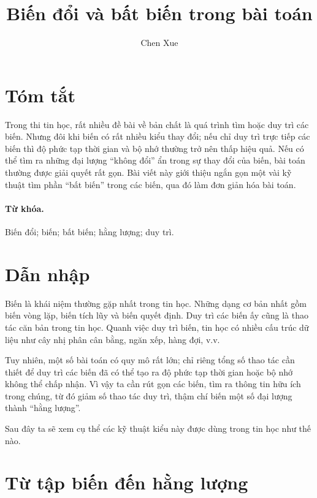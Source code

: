\documentclass[11pt]{article}
\title{Biến đổi và bất biến trong bài toán}
\author{Chen Xue}
\date{}
\begin{document}
\maketitle


\section*{Tóm tắt}

Trong thi tin học, rất nhiều đề bài về bản chất là quá trình tìm hoặc duy trì
các biến. Nhưng đôi khi biến có rất nhiều kiểu thay đổi; nếu chỉ duy trì trực
tiếp các biến thì độ phức tạp thời gian và bộ nhớ thường trở nên thấp hiệu
quả. Nếu có thể tìm ra những đại lượng ``không đổi'' ẩn trong sự thay đổi của
biến, bài toán thường được giải quyết rất gọn. Bài viết này giới thiệu ngắn
gọn một vài kỹ thuật tìm phần ``bất biến'' trong các biến, qua đó làm đơn giản
hóa bài toán.

\paragraph{Từ khóa.}
Biến đổi; biến; bất biến; hằng lượng; duy trì.

\section{Dẫn nhập}

Biến là khái niệm thường gặp nhất trong tin học. Những dạng cơ bản nhất gồm
biến vòng lặp, biến tích lũy và biến quyết định. Duy trì các biến ấy cũng là
thao tác căn bản trong tin học. Quanh việc duy trì biến, tin học có nhiều cấu
trúc dữ liệu như cây nhị phân cân bằng, ngăn xếp, hàng đợi, v.v.

Tuy nhiên, một số bài toán có quy mô rất lớn; chỉ riêng tổng số thao tác cần
thiết để duy trì các biến đã có thể tạo ra độ phức tạp thời gian hoặc bộ nhớ
không thể chấp nhận. Vì vậy ta cần rút gọn các biến, tìm ra thông tin hữu ích
trong chúng, từ đó giảm số thao tác duy trì, thậm chí biến một số đại lượng
thành ``hằng lượng''.

Sau đây ta sẽ xem cụ thể các kỹ thuật kiểu này được dùng trong tin học như
thế nào.

\section{Từ tập biến đến hằng lượng}
\end{document}
